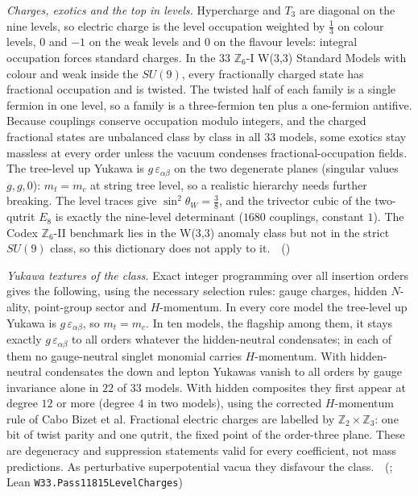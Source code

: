 \emph{Charges, exotics and the top in levels.} Hypercharge and $T_3$ are diagonal on the nine levels, so electric charge is
the level occupation weighted by $\tfrac13$ on colour levels, $0$ and $-1$ on the weak levels and $0$ on the flavour levels:
integral occupation forces standard charges. In the $33$ $\mathbb Z_6$-I W(3,3) Standard Models with colour and weak inside
the $SU(9)$, every fractionally charged state has fractional occupation and is twisted. The twisted half of each family is a
single fermion in one level, so a family is a three-fermion ten plus a one-fermion antifive. Because couplings conserve
occupation modulo integers, and the charged fractional states are unbalanced class by class in all $33$ models, some exotics
stay massless at every order unless the vacuum condenses fractional-occupation fields. The tree-level up Yukawa is
$g\,\varepsilon_{\alpha\beta}$ on the two degenerate planes (singular values $g,g,0$): $m_t=m_c$ at string tree level, so a
realistic hierarchy needs further breaking. The level traces give $\sin^2\theta_W=\tfrac38$, and the trivector cubic of
the two-qutrit $E_8$ is exactly the nine-level determinant ($1680$ couplings, constant $1$). The Codex $\mathbb Z_6$-II
benchmark lies in the W(3,3) anomaly class but not in the strict $SU(9)$ class, so this dictionary does not apply to it.
\tierT\,\tierC\ ()

\emph{Yukawa textures of the class.} Exact integer programming over all insertion orders gives the following, using the
necessary selection rules: gauge charges, hidden $N$-ality, point-group sector and $H$-momentum. In every core model the
tree-level up Yukawa is $g\,\varepsilon_{\alpha\beta}$, so $m_t=m_c$. In ten models, the flagship among them, it stays exactly
$g\,\varepsilon_{\alpha\beta}$ to all orders whatever the hidden-neutral condensates; in each of them no gauge-neutral singlet
monomial carries $H$-momentum. With hidden-neutral condensates the down and lepton Yukawas vanish to all orders by gauge
invariance alone in $22$ of $33$ models. With hidden composites they first appear at degree $12$ or more (degree $4$ in two
models), using the corrected $H$-momentum rule of Cabo Bizet et al. Fractional electric charges are labelled by $\mathbb Z_2\times\mathbb Z_3$:
one bit of twist parity and one qutrit, the fixed point of the order-three plane. These are degeneracy and suppression
statements valid for every coefficient, not mass predictions. As perturbative superpotential vacua they disfavour the class.
\tierT\,\tierC\ (; Lean \texttt{W33.Pass11815LevelCharges})

